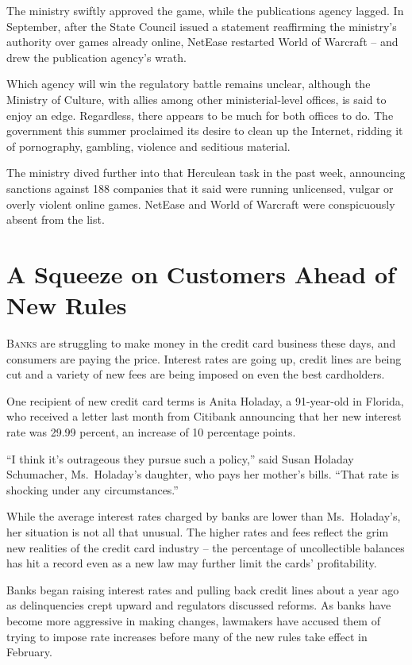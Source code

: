 ﻿\documentclass[12pt]{article}
\begin{document}
The ministry swiftly approved the game, while the publications agency lagged. In September, after
the State Council issued a statement reaffirming the ministry's authority over games already online,
NetEase restarted World of Warcraft -- and drew the publication agency's wrath.

Which agency will win the regulatory battle remains unclear, although the Ministry of Culture, with
allies among other ministerial-level offices, is said to enjoy an edge. Regardless, there appears to
be much for both offices to do. The government this summer proclaimed its desire to clean up the
Internet, ridding it of pornography, gambling, violence and seditious material.

The ministry dived further into that Herculean task in the past week, announcing sanctions against
188 companies that it said were running unlicensed, vulgar or overly violent online games. NetEase
and World of Warcraft were conspicuously absent from the list.

\section{A Squeeze on Customers Ahead of New Rules}

\lettrine{B}{anks} are struggling to make money in the credit card business
these days, and consumers are paying the price. Interest rates are going up, credit lines are being
cut and a variety of new fees are being imposed on even the best cardholders.

One recipient of new credit card terms is Anita Holaday, a 91-year-old in Florida, who received a
letter last month from Citibank announcing that her new interest rate was 29.99 percent, an increase
of 10 percentage points.

``I think it's outrageous they pursue such a policy,'' said Susan Holaday Schumacher, Ms.~Holaday's
daughter, who pays her mother's bills. ``That rate is shocking under any circumstances.''

While the average interest rates charged by banks are lower than Ms.~Holaday's, her situation is not
all that unusual. The higher rates and fees reflect the grim new realities of the credit card
industry -- the percentage of uncollectible balances has hit a record even as a new law may further
limit the cards' profitability.

Banks began raising interest rates and pulling back credit lines about a year ago as delinquencies
crept upward and regulators discussed reforms. As banks have become more aggressive in making
changes, lawmakers have accused them of trying to impose rate increases before many of the new rules
take effect in February.
\end{document}
